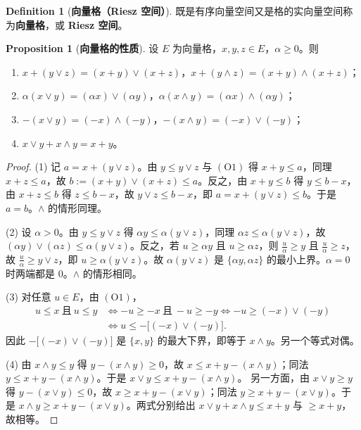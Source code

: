 \documentclass[oneside]{book}
\theoremstyle{definition}
\theoremstyle{definition}
\newtheorem{proposition}{Proposition}[section]
\newtheorem{definition}{Definition}[section]
\begin{document}
	\begin{definition}[\bfseries{向量格（Riesz 空间）}]
		既是有序向量空间又是格的实向量空间称为\textbf{向量格}，或 \textbf{Riesz 空间}。
	\end{definition}
	
	
	\begin{proposition}[\bfseries{向量格的性质}]
		设 $E$ 为向量格，$x,y,z\in E$，$\alpha\geqslant0$。则
		\begin{enumerate}[label=(\arabic*),leftmargin=2.2em,itemsep=0.1em,topsep=0.3em]
			\item $x+(y\vee z)=(x+y)\vee(x+z)$，\quad $x+(y\wedge z)=(x+y)\wedge(x+z)$；
			\item $\alpha(x\vee y)=(\alpha x)\vee(\alpha y)$，\quad $\alpha(x\wedge y)=(\alpha x)\wedge(\alpha y)$；
			\item $-(x\vee y)=(-x)\wedge(-y)$，\quad $-(x\wedge y)=(-x)\vee(-y)$；
			\item $x\vee y+x\wedge y=x+y$。
		\end{enumerate}
	\end{proposition}
	
	\begin{proof}
		(1) 记 $a=x+(y\vee z)$。由 $y\leqslant y\vee z$ 与 $(\mathrm{O}1)$ 得 $x+y\leqslant a$，同理 $x+z\leqslant a$，故 $b:=(x+y)\vee(x+z)\leqslant a$。反之，由 $x+y\leqslant b$ 得 $y\leqslant b-x$，由 $x+z\leqslant b$ 得 $z\leqslant b-x$，故 $y\vee z\leqslant b-x$，即 $a=x+(y\vee z)\leqslant b$。于是 $a=b$。$\wedge$ 的情形同理。
		
		(2) 设 $\alpha>0$。由 $y\leqslant y\vee z$ 得 $\alpha y\leqslant\alpha(y\vee z)$，同理 $\alpha z\leqslant\alpha(y\vee z)$，故 $(\alpha y)\vee(\alpha z)\leqslant\alpha(y\vee z)$。反之，若 $u\geqslant\alpha y$ 且 $u\geqslant\alpha z$，则 $\tfrac{u}{\alpha}\geqslant y$ 且 $\tfrac{u}{\alpha}\geqslant z$，故 $\tfrac{u}{\alpha}\geqslant y\vee z$，即 $u\geqslant\alpha(y\vee z)$。故 $\alpha(y\vee z)$ 是 $\{\alpha y,\alpha z\}$ 的最小上界。$\alpha=0$ 时两端都是 $0$。$\wedge$ 的情形相同。
		
		(3) 对任意 $u\in E$，由 $(\mathrm{O}1)$，
		\[
		\begin{aligned}
			u\leqslant x\ \text{且}\ u\leqslant y
			&\iff -u\geqslant -x\ \text{且}\ -u\geqslant -y
			\iff -u\geqslant (-x)\vee(-y)\\
			&\iff u\leqslant -\big[(-x)\vee(-y)\big].
		\end{aligned}
		\]
		因此 $-\big[(-x)\vee(-y)\big]$ 是 $\{x,y\}$ 的最大下界，即等于 $x\wedge y$。另一个等式对偶。
		
		(4) 由 $x\wedge y\leqslant y$ 得 $y-(x\wedge y)\geqslant0$，故 $x\leqslant x+y-(x\wedge y)$；同法 $y\leqslant x+y-(x\wedge y)$。于是 $x\vee y\leqslant x+y-(x\wedge y)$。
		另一方面，由 $x\vee y\geqslant y$ 得 $y-(x\vee y)\leqslant0$，故 $x\geqslant x+y-(x\vee y)$；同法 $y\geqslant x+y-(x\vee y)$。于是 $x\wedge y\geqslant x+y-(x\vee y)$。两式分别给出 $x\vee y+x\wedge y\leqslant x+y$ 与 $\geqslant x+y$，故相等。
	\end{proof}
	
\end{document}
